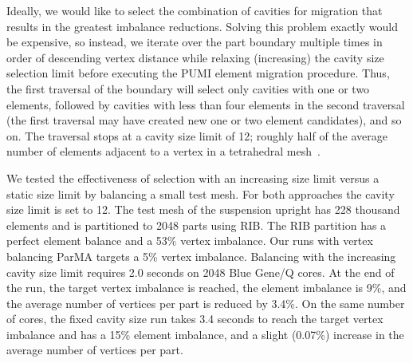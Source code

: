 Ideally, we would like to select the combination of cavities for migration that
results in the greatest imbalance reductions.
Solving this problem exactly would be expensive, so instead, we iterate over the
part boundary multiple times in order of descending vertex distance while
relaxing (increasing) the cavity size selection limit before executing the PUMI
element migration procedure.
Thus, the first traversal of the boundary will select only cavities with one or
two elements, followed by cavities with less than four elements in the second
traversal (the first traversal may have created new one or two element
candidates), and so on.
The traversal stops at a cavity size limit of 12; roughly half of the average
number of elements adjacent to a vertex in a tetrahedral
mesh~\cite{beall1997general}.

We tested the effectiveness of selection with an increasing size limit
versus a static size limit by balancing a small test mesh.
For both approaches the cavity size limit is set to 12.
The test mesh of the suspension upright has 228 thousand elements and is partitioned to
2048 parts using RIB.
The RIB partition has a perfect element balance and a 53\% vertex imbalance.
Our runs with vertex balancing ParMA targets a 5\% vertex imbalance.
Balancing with the increasing cavity size limit requires 2.0 seconds on 2048
Blue Gene/Q cores.
At the end of the run, the target vertex imbalance is reached, the element
imbalance is 9\%, and the average number of vertices per part is reduced by 3.4\%.
On the same number of cores, the fixed cavity size run takes 3.4 seconds to reach
the target vertex imbalance and has a 15\% element imbalance, and a slight
(0.07\%) increase in the average number of vertices per part.

